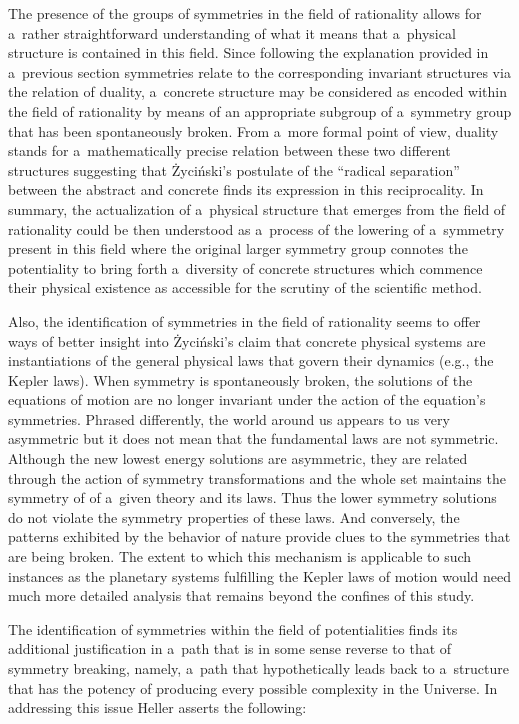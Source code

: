 The presence of the groups of symmetries in the field of rationality allows for a~rather straightforward understanding of what it means that a~physical structure is contained in this field. Since following the explanation provided in a~previous section symmetries relate to the corresponding invariant structures via the relation of duality, a~concrete structure may be considered as encoded within the field of rationality by means of an appropriate subgroup of a~symmetry group that has been spontaneously broken. From a~more formal point of view, duality stands for a~mathematically precise relation between these two different structures suggesting that Życiński's postulate of the ``radical separation'' between the abstract and concrete finds its expression in this reciprocality. In summary, the actualization of a~physical structure that emerges from the field of rationality could be then understood as a~process of the lowering of a~symmetry present in this field where the original larger symmetry group connotes the potentiality to bring forth a~diversity of concrete structures which commence their physical existence as accessible for the scrutiny of the scientific method.



Also, the identification of symmetries in the field of rationality seems to offer ways of better insight into Życiński's claim that concrete physical systems are instantiations of the general physical laws that govern their dynamics (e.g., the Kepler laws). When symmetry is spontaneously broken, the solutions of the equations of motion are no longer invariant under the action of the equation's symmetries. Phrased differently, the world around us appears to us very asymmetric but it does not mean that the fundamental laws are not symmetric. Although the new lowest energy solutions are asymmetric, they are related through the action of symmetry transformations and the whole set maintains the symmetry of of a~given theory and its laws. Thus the lower symmetry solutions do not violate the symmetry properties of these laws. And conversely, the patterns exhibited by the behavior of nature provide clues to the symmetries that are being broken. The extent to which this mechanism is applicable to such instances as the planetary systems fulfilling the Kepler laws of motion would need much more detailed analysis that remains beyond the confines of this study.



The identification of symmetries within the field of potentialities finds its additional justification in a~path that is in some sense reverse to that of symmetry breaking, namely, a~path that hypothetically leads back to a~structure that has the potency of producing every possible complexity in the Universe. In addressing this issue Heller 
\parencite*[][p.232]{heller_uchwycic_1997} %
 asserts the following:




